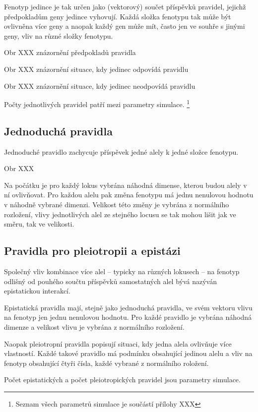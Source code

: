 Fenotyp jedince je tak určen jako (vektorový) součet příspěvků pravidel, jejichž předpokladům geny jedince vyhovují. Každá složka fenotypu tak může být ovlivněna více geny a naopak každý gen může mít, často jen ve souhře s jinými geny, vliv na různé složky fenotypu.

Obr XXX znázornění předpokladů pravidla

Obr XXX znázornění situace, kdy jedinec odpovídá pravidlu

Obr XXX znázornění situace, kdy jedinec neodpovídá pravidlu

Počty jednotlivých pravidel patří mezi parametry simulace.
\footnote{Seznam všech parametrů simulace je součástí přílohy XXX}

\subsection{Jednoduchá pravidla}

Jednoduché pravidlo zachycuje příspěvek jedné alely k jedné složce fenotypu.

Obr XXX

Na počátku je pro každý lokus vybrána náhodná dimense, kterou budou alely v ní ovlivňovat. Pro každou alelu pak změna fenotypu má jednu nenulovou hodnotu v náhodně vybrané dimenzi. Velikost této změny je vybrána z normálního rozložení, vlivy jednotlivých alel ze stejného locusu se tak mohou lišit jak ve směru, tak ve velikosti.

\subsection{Pravidla pro pleiotropii a epistázi}

Společný vliv kombinace více alel -- typicky na různých lokusech -- na fenotyp odlišný od pouhého součtu příspěvků samostatných alel bývá nazýván epistatickou interakcí.

Epistatická pravidla mají, stejně jako jednoduchá pravidla, ve svém vektoru vlivu na fenotyp jen jednu nenulovou hodnotu. Pro každé pravidlo je vybrána náhodná dimenze a velikost vlivu je vybrána z normálního rozložení.

Naopak pleiotropní pravidla popisují situaci, kdy jedna alela ovlivňuje více vlastností. Každé takové pravidlo má podmínku obsahující jedinou alelu a vliv na fenotyp obsahující čtyři čísla, každé vybrané z normálního roložení.

Počet epistatických a počet pleiotropických pravidel jsou parametry simulace.

